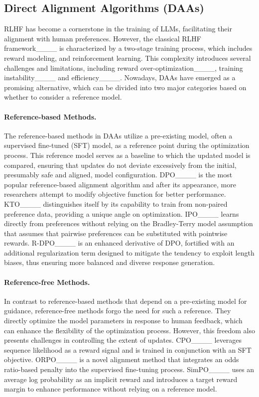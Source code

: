 \subsection{Direct Alignment Algorithms (DAAs)}
RLHF has become a cornerstone in the training of LLMs, facilitating their alignment with human preferences. However, the classical RLHF framework____ is characterized by a two-stage training process, which includes reward modeling, and reinforcement learning. This complexity introduces several challenges and limitations, including reward over-optimization____, training instability____ and efficiency____. 
Nowadays, DAAs have emerged as a promising alternative, which can be divided into two major categories based on whether to consider a reference model.

\vspace{-0.25cm}
\paragraph{Reference-based Methods.}
The reference-based methods in DAAs utilize a pre-existing model, often a supervised fine-tuned (SFT) model, as a reference point during the optimization process. This reference model serves as a baseline to which the updated model is compared, ensuring that updates do not deviate excessively from the initial, presumably safe and aligned, model configuration. DPO____ is the most popular reference-based alignment algorithm and after its appearance, more researchers attempt to modify objective function for better performance. KTO____ distinguishes itself by its capability to train from non-paired preference data, providing a unique angle on optimization. IPO____ learns directly from preferences without relying on the Bradley-Terry model assumption that assumes that pairwise preferences can be substituted with pointwise rewards. R-DPO____ is an enhanced derivative of DPO, fortified with an additional regularization term designed to mitigate the tendency to exploit length biases, thus ensuring more balanced and diverse response generation.

\vspace{-0.25cm}
\paragraph{Reference-free Methods.}
In contrast to reference-based methods that depend on a pre-existing model for guidance, reference-free methods forgo the need for such a reference. They directly optimize the model parameters in response to human feedback, which can enhance the flexibility of the optimization process. However, this freedom also presents challenges in controlling the extent of updates. CPO____ leverages sequence likelihood as a reward signal and is trained in conjunction with an SFT objective. ORPO____ is a novel alignment method that integrates an odds ratio-based penalty into the supervised fine-tuning process. SimPO____ uses an average log probability as an implicit reward and introduces a target reward margin to enhance performance without relying on a reference model.
